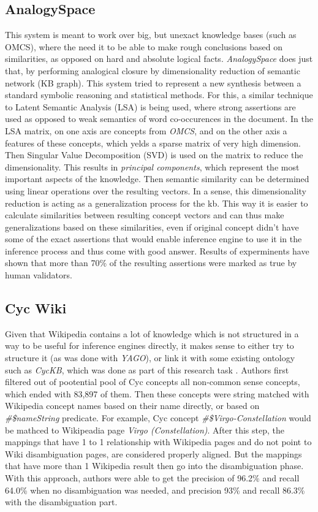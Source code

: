 \subsection{AnalogySpace}
This system is meant to work over big, but unexact knowledge bases 
(such as OMCS), where the need it to be able to make rough conclusions based
on similarities, as opposed on hard and absolute logical facts. 
\emph{AnalogySpace} does just that, by performing analogical closure by
dimensionality reduction of semantic network (KB graph)\parencite{Speer2008}. 
This system tried to represent a new synthesis between a standard symbolic 
reasoning and statistical methods. For this, a similar technique to Latent
Semantic Analysis (LSA) is being used, where strong assertions are used as
opposed to weak semantics of word co-occurences in the document. In the 
LSA matrix, on one axis are concepts from \emph{OMCS}, and on the other
axis a features of these concepts, which yelds a sparse matrix of very
high dimension. Then Singular Value Decomposition (SVD) is used on the matrix
to reduce the dimensionality. This results in \emph{principal components},
which represent the most important aspects of the knowledge. Then semantic
similarity can be determined using linear operations over the resulting vectors.
In a sense, this dimensionality reduction is acting as a generalization process
for the kb. This way it is easier to calculate similarities between resulting
concept vectors and can thus make generalizations based on these similarities,
even if original concept didn't have some of the exact assertions that would
enable inference engine to use it in the inference process and thus come with
good answer. 
Results of experminents have shown that more than 70\% of the resulting 
assertions were marked as true by human validators.

\subsection{Cyc Wiki}
Given that Wikipedia contains a lot of knowledge which is not structured in 
a way to be useful for inference engines directly, it makes sense to either try
to structure it (as was done with \emph{YAGO}), or link it with some existing
ontology such as \emph{CycKB}, which was done as part of this research task
\parencite{Medelyan2008}.
Authors first filtered out of pootential pool of Cyc concepts all non-common 
sense concepts, which ended with 83,897 of them. Then these concepts were
string matched with Wikipedia concept names based on their name directly,
or based on \emph{\#\$nameString} predicate. For example, Cyc concept
\emph{\#\$Virgo-Constellation} would be mathced to Wikipeadia page 
\emph{Virgo (Constellation)}. After this step, the mappings that have 1 to 1
relationship with Wikipedia pages and do not point to Wiki disambiguation pages,
are considered properly aligned. But the mappings that have more than 1 
Wikipedia result then go into the disambiguation phase. With this approach,
authors were able to get the precision of 96.2\% and recall 64.0\% when no 
disambiguation was needed, and precision 93\% and recall 86.3\% with the 
disambiguation part.


